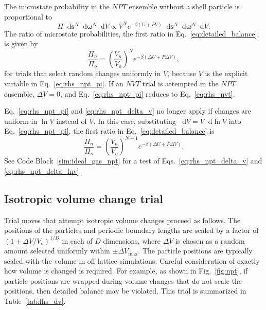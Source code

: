\documentclass[
  9pt,
  bestpractices,
]{livecoms}
\newcommand*\diff{\mathop{}\!\mathrm{d}}
\begin{document}
The microstate probability in the $NPT$ ensemble without a shell particle is proportional to \cite{wood_monte_1968, allen_computer_1989, frenkel_understanding_2002}
\begin{equation}
\Pi \diff\mathbf{s}^{N}\diff\boldsymbol{\omega}^{N}\diff V \propto V^{N} e^{-\beta(U+P V)} \diff\mathbf{s}^{N} \diff\boldsymbol{\omega}^{N}\diff V.
\label{eq:rhs_npt_pi}
\end{equation}
The ratio of microstate probabilities, the first ratio in Eq.~\ref{eq:detailed_balance}, is given by
\begin{equation}
\frac{\Pi_n}{\Pi_o} = \left(\frac{V_n}{V_o}\right)^{N}e^{-\beta(\Delta U + P\Delta V)},
\label{eq:rhs_npt_delta_v}
\end{equation}
for trials that select random changes uniformly in $V$, because $V$ is the explicit variable in Eq.~\ref{eq:rhs_npt_pi}.
If an $NVT$ trial is attempted in the $NPT$ ensemble, $\Delta V=0$, and Eq.~\ref{eq:rhs_npt_pi} reduces to Eq.~\ref{eq:rhs_nvt}.

Eq.~\ref{eq:rhs_npt_pi} and \ref{eq:rhs_npt_delta_v} no longer apply if changes are uniform in $\ln V$ instead of $V$.
In this case, substituting $\diff V=V\diff\ln V$ into Eq.~\ref{eq:rhs_npt_pi}, the first ratio in Eq.~\ref{eq:detailed_balance} is
\begin{equation}
\frac{\Pi_n}{\Pi_o} = \left(\frac{V_n}{V_o}\right)^{N+1}e^{-\beta(\Delta U + P\Delta V)}.
\label{eq:rhs_npt_delta_lnv}
\end{equation}
See Code Block~\ref{sim:ideal_gas_npt} for a test of Eqs.~\ref{eq:rhs_npt_delta_v} and \ref{eq:rhs_npt_delta_lnv}.

\subsection{\label{sec:lhs_dv}Isotropic volume change trial}

Trial moves that attempt isotropic volume changes proceed as follows.
The positions of the particles and periodic boundary lengths are scaled by a factor of $(1+\Delta V/V_o)^{1/D}$ in each of $D$ dimensions, where $\Delta V$ is chosen as a random amount selected uniformly within $\pm\Delta V_{\mathrm{max}}$.
The particle positions are typically scaled with the volume in off lattice simulations.
Careful consideration of exactly how volume is changed is required.
For example, as shown in Fig.~\ref{fig:npt}, if particle positions are wrapped during volume changes that do not scale the positions, then detailed balance may be violated.
This trial is summarized in Table~\ref{tab:lhs_dv}.
\end{document}
